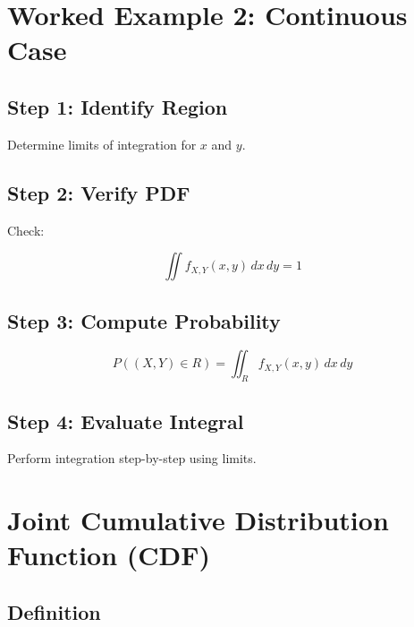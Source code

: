 \documentclass[11pt]{article}
\begin{document}

\section{Worked Example 2: Continuous Case}

\subsection{Step 1: Identify Region}

Determine limits of integration for $x$ and $y$.

\vspace{0.3cm}

\subsection{Step 2: Verify PDF}

Check:

\[
\iint f_{X,Y}(x,y)\,dx\,dy = 1
\]

\vspace{0.3cm}

\subsection{Step 3: Compute Probability}

\[
P((X,Y)\in R) = \iint_R f_{X,Y}(x,y)\,dx\,dy
\]

\vspace{0.3cm}

\subsection{Step 4: Evaluate Integral}

Perform integration step-by-step using limits.

\vspace{0.5cm}


\section{Joint Cumulative Distribution Function (CDF)}

\subsection{Definition}
\end{document}
